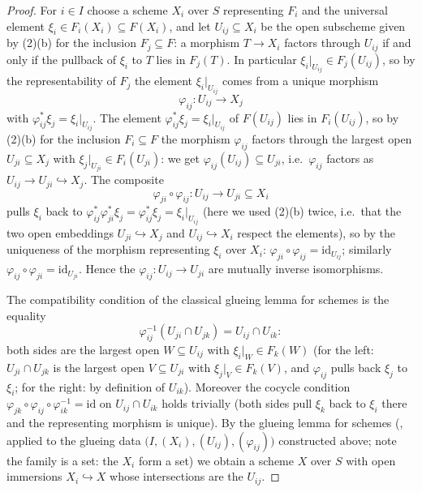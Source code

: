 \begin{proof}
For $i\in I$ choose a scheme $X_i$ over $S$ representing $F_i$ and the
universal element $\xi_i\in F_i(X_i)\subseteq F(X_i)$, and let
$U_{ij}\subseteq X_i$ be the open subscheme given by (2)(b) for the
inclusion $F_j\subseteq F$: a morphism $T\to X_i$ factors through
$U_{ij}$ if and only if the pullback of $\xi_i$ to $T$ lies in
$F_j(T)$.  In particular $\xi_i|_{U_{ij}}\in F_j(U_{ij})$, so by the
representability of $F_j$ the element $\xi_i|_{U_{ij}}$ comes from a
unique morphism
\[
\varphi_{ij}:U_{ij}\longrightarrow X_j
\]
with $\varphi_{ij}^*\xi_j=\xi_i|_{U_{ij}}$.  The element
$\varphi_{ij}^*\xi_j=\xi_i|_{U_{ij}}$ of $F(U_{ij})$ lies in
$F_i(U_{ij})$, so by (2)(b) for the inclusion $F_i\subseteq F$ the
morphism $\varphi_{ij}$ factors through the largest open
$U_{ji}\subseteq X_j$ with $\xi_j|_{U_{ji}}\in F_i(U_{ji})$: we get
$\varphi_{ij}(U_{ij})\subseteq U_{ji}$, i.e.\ $\varphi_{ij}$ factors
as $U_{ij}\to U_{ji}\hookrightarrow X_j$.  The
composite
\[
\varphi_{ji}\circ\varphi_{ij}:U_{ij}\longrightarrow U_{ji}\subseteq X_i
\]
pulls $\xi_i$ back to
$\varphi_{ij}^*\varphi_{ji}^*\xi_j=\varphi_{ij}^*\xi_j=\xi_i|_{U_{ij}}$
(here we used (2)(b) twice, i.e.\ that the two open embeddings
$U_{ji}\hookrightarrow X_j$ and $U_{ij}\hookrightarrow X_i$ respect
the elements), so by the uniqueness of the morphism representing
$\xi_i$ over $X_i$: $\varphi_{ji}\circ\varphi_{ij}
=\mathrm{id}_{U_{ij}}$; similarly
$\varphi_{ij}\circ\varphi_{ji}=\mathrm{id}_{U_{ji}}$.  Hence the
$\varphi_{ij}:U_{ij}\to U_{ji}$ are mutually inverse isomorphisms.

The compatibility condition of the classical glueing lemma for schemes
is the equality
\[
\varphi_{ij}^{-1}(U_{ji}\cap U_{jk})=U_{ij}\cap U_{ik} :
\]
both sides are the largest open $W\subseteq U_{ij}$ with
$\xi_i|_W\in F_k(W)$ (for the left: $U_{ji}\cap U_{jk}$ is the
largest open $V\subseteq U_{ji}$ with $\xi_j|_V\in F_k(V)$, and
$\varphi_{ij}$ pulls back $\xi_j$ to $\xi_i$; for the right: by
definition of $U_{ik}$).  Moreover the cocycle condition
$\varphi_{jk}\circ\varphi_{ij}\circ\varphi_{ik}^{-1}
=\mathrm{id}$ on $U_{ij}\cap U_{ik}$ holds trivially (both sides pull
$\xi_k$ back to $\xi_i$ there and the representing morphism is
unique).  By the glueing lemma for schemes
(, applied to the glueing data
$\bigl(I,(X_i),(U_{ij}),(\varphi_{ij})\bigr)$ constructed above; note
the family is a set: the $X_i$ form a set) we
obtain a scheme $X$ over $S$ with open immersions
$X_i\hookrightarrow X$ whose intersections are the $U_{ij}$.


\end{proof}
